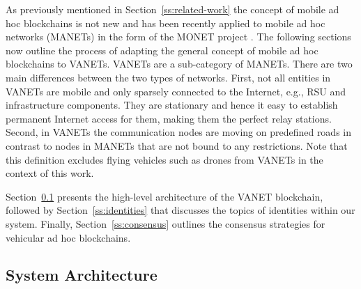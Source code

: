 \documentclass{llncs}
\begin{document}
{		As previously mentioned in Section~\ref{ss:related-work} the concept of mobile ad hoc blockchains is not new and has been recently applied to mobile ad hoc networks (MANETs) in the form of the MONET project \cite{monetWhitepaper}. The following sections now outline the process of adapting the general concept of mobile ad hoc blockchains to VANETs. VANETs are a sub-category of MANETs. There are two main differences between the two types of networks. First, not all entities in VANETs are mobile and only sparsely connected to the Internet, e.g., RSU and infrastructure components. They are stationary and hence it easy to establish permanent Internet access for them, making them the perfect relay stations. Second, in VANETs the communication nodes are moving on predefined roads in contrast to nodes in MANETs that are not bound to any restrictions. Note that this definition excludes flying vehicles such as drones from VANETs in the context of this work.  
		
		Section~\ref{ss:architecture-overview} presents the high-level architecture of the VANET blockchain, followed by Section~\ref{ss:identities} that discusses the topics of identities within our system. Finally, Section~\ref{ss:consensus} outlines the consensus strategies for vehicular ad hoc blockchains.
		
		
		\subsection{System Architecture}
			\label{ss:architecture-overview}
			
}
\end{document}
